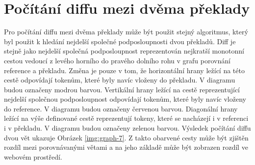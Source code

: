 \section{Počítání diffu mezi dvěma překlady}
Pro počítání diffu mezi dvěma překlady může být použit stejný algoritmus,
  který byl použit k hledání nejdelší společné podposloupnosti dvou překladů.
Diff je stejně jako nejdelší společná podposloupnost reprezentován nejkratší monotonní cestou vedoucí z levého horního do pravého dolního rohu v grafu porovnání reference a překladu.
Změna je pouze v tom, že horizontální hrany ležící na této cestě odpovídají tokenům,
  které byly navíc vloženy do překladu.
V diagramu budou označeny modrou barvou.
Vertikální hrany ležící na cestě reprezentující nejdelší společnou podposloupnost odpovídají tokenům,
  které byly navíc vloženy do reference.
V diagramu budou označeny červenou barvou.
Diagonální hrany ležící na výše definované cestě reprezentují tokeny,
  které se nacházejí i v referenci i v překladu.
V diagramu budou označeny zelenou barvou.
Výsledek počítání diffu dvou vět ukazuje Obrázek \ref{img:graph-7}.
Z takto obarvené cesty může být zjištěn rozdíl mezi porovnávanými větami
  a na jeho základě může být zobrazen rozdíl ve webovém prostředí.

